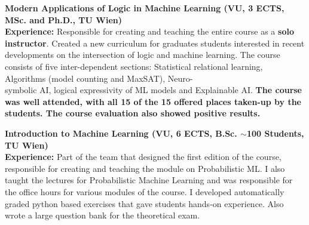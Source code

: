 \documentclass[10pt, a4paper]{article}
\newcommand{\years}[1]{\marginnote{\scriptsize #1}}
\begin{document}
\years{2025S}\textbf{Modern Applications of Logic in Machine Learning (VU, 3 ECTS, MSc. and Ph.D., TU Wien)}\\ 
\textbf{Experience:}  Responsible for creating and teaching the entire course as a \textbf{solo instructor}. Created a new curriculum for graduates students interested in recent developments on the intersection of logic and machine learning. The course consists of five inter-dependent sections: Statistical relational learning, Algorithms (model counting and MaxSAT), Neuro- \\symbolic AI, logical expressivity of ML models and Explainable AI.
\textbf{The course was well attended, with all 15 of the 15 offered places taken-up by the students. The course evaluation also showed positive results.}\\

\newpage

\years{2023 - Now} \textbf{Introduction to Machine Learning (VU, 6 ECTS, B.Sc. $\sim$100 Students, TU Wien)}\\
\textbf{Experience:} Part of the team that designed the first edition of the course, responsible for creating and teaching the module on Probabilistic ML. I also taught the lectures for Probabilistic Machine Learning and was responsible for the office hours for various modules of the course. I developed automatically graded python based exercises that gave students hands-on experience. Also wrote a large question bank for the theoretical exam. \\ \\
\end{document}
